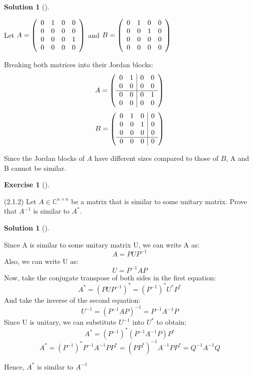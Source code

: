 \documentclass[numbers=enddot,12pt,final,onecolumn,notitlepage]{scrartcl}
\newcounter{exer}
\newcounter{sol}
\theoremstyle{definition}
\newtheorem{exmp}[exer]{Exercise}
\newenvironment{exercise}[1][]
{\begin{exmp}[#1]\begin{leftbar}}
        {\end{leftbar}\end{exmp}}
\newtheorem{solu}[sol]{Solution}
\newenvironment{solution}[1][]
{\begin{solu}[#1]\begin{leftbar}}
        {\end{leftbar}\end{solu}}
\begin{document}
\begin{solution}
	Let $A = \left(
		\begin{array}
				[c]{cccc}%
				0 & 1 & 0 & 0 \\
				0 & 0 & 0 & 0 \\
				0 & 0 & 0 & 1 \\
				0 & 0 & 0 & 0
			\end{array}
		\right)$ and $B = \left(
		\begin{array}
				[c]{cccc}%
				0 & 1 & 0 & 0 \\
				0 & 0 & 1 & 0 \\
				0 & 0 & 0 & 0 \\
				0 & 0 & 0 & 0
			\end{array}
		\right)$

	Breaking both matrices into their Jordan blocks:
	\[
		A = \left(
		\begin{array}
				[c]{cc|cc}%
				0 & 1 & 0 & 0 \\
				0 & 0 & 0 & 0 \\
				\hline
				0 & 0 & 0 & 1 \\
				0 & 0 & 0 & 0
			\end{array}
		\right)
	\]
	\[
		B = \left(
		\begin{array}
				[c]{ccc|c}%
				0 & 1 & 0 & 0 \\
				0 & 0 & 1 & 0 \\
				0 & 0 & 0 & 0 \\
				\hline
				0 & 0 & 0 & 0
			\end{array}
		\right)
	\]

	Since the Jordan blocks of $A$ have different sizes compared to those of $B$, A and B cannot be similar.

\end{solution}

\begin{exercise}
	\label{exe.schurtri.similar.unitary-inv} (2.1.2) Let $A\in\mathbb{C}^{n\times
			n}$ be a matrix that is similar to some unitary matrix. Prove that $A^{-1}$ is
	similar to $A^{\ast}$.
\end{exercise}

\begin{solution}
	Since A is similar to some unitary matrix U, we can write A as:
	\[
		A = PUP^{-1}
	\]
	Also, we can write U as:
	\[
		U = P^{-1}AP
	\]
	Now, take the conjugate transpose of both sides in the first equation:
	\[
		A^{\ast} = (PUP^{-1})^{\ast} = (P^{-1})^{\ast}U^{\ast}P^{\ast}
	\]
	And take the inverse of the second equation:
	\[
		U^{-1} = (P^{-1}AP)^{-1} = P^{-1}A^{-1}P
	\]
	Since U is unitary, we can substitute $U^{-1}$ into $U^{\ast}$ to obtain:
	\[
		A^{\ast} = (P^{-1})^{\ast} (P^{-1}A^{-1}P) P^{\ast}
	\]
	\[
		A^{\ast} = (P^{-1})^{\ast}P^{-1}A^{-1}PP^{\ast} = (PP^{\ast})^{-1}A^{-1}PP^{\ast} = Q^{-1}A^{-1}Q
	\]

	Hence, $A^{\ast}$ is similar to $A^{-1}$

\end{solution}
\end{document}
